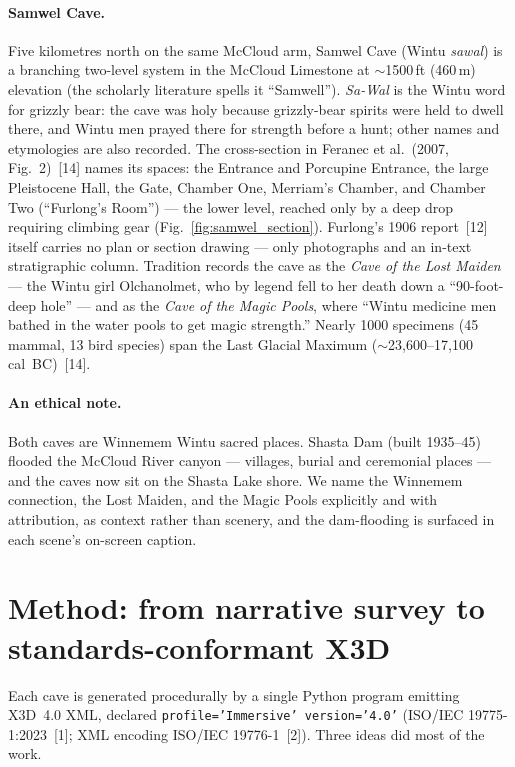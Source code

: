 \documentclass[11pt]{article}
\begin{document}
\paragraph{Samwel Cave.} Five kilometres north on the same McCloud arm, Samwel
Cave (Wintu \emph{sawal}) is a branching two-level system in the McCloud Limestone
at $\sim$1500\,ft (460\,m) elevation (the scholarly literature spells it
``Samwell''). \emph{Sa-Wal} is the Wintu word for grizzly bear: the cave was holy
because grizzly-bear spirits were held to dwell there, and Wintu men prayed there
for strength before a hunt; other names and etymologies are also recorded. The
cross-section in Feranec et al.\ (2007, Fig.~2)~[14] names its spaces: the Entrance
and Porcupine Entrance, the large Pleistocene Hall, the Gate, Chamber One,
Merriam's Chamber, and Chamber Two (``Furlong's Room'') --- the lower level,
reached only by a deep drop requiring climbing gear
(Fig.~\ref{fig:samwel_section}). Furlong's 1906 report~[12] itself carries no plan
or section drawing --- only photographs and an in-text stratigraphic column. Tradition records the cave as the \emph{Cave of
the Lost Maiden} --- the Wintu girl Olchanolmet, who by legend fell to her death
down a ``90-foot-deep hole'' --- and as the \emph{Cave of the Magic Pools}, where
``Wintu medicine men bathed in the water pools to get magic strength.'' Nearly
1000 specimens (45 mammal, 13 bird species) span the Last Glacial Maximum
($\sim$23{,}600--17{,}100 cal~BC)~[14].

\paragraph{An ethical note.} Both caves are Winnemem Wintu sacred places. Shasta
Dam (built 1935--45) flooded the McCloud River canyon --- villages, burial and
ceremonial places --- and the caves now sit on the Shasta Lake shore. We name the
Winnemem connection, the Lost Maiden, and the Magic Pools explicitly and with
attribution, as context rather than scenery, and the dam-flooding is surfaced in
each scene's on-screen caption.

\section{Method: from narrative survey to standards-conformant X3D}

Each cave is generated procedurally by a single Python program emitting X3D~4.0
XML, declared \texttt{profile='Immersive' version='4.0'} (ISO/IEC
19775-1:2023~[1]; XML encoding ISO/IEC 19776-1~[2]). Three ideas did most of the
work.
\end{document}
